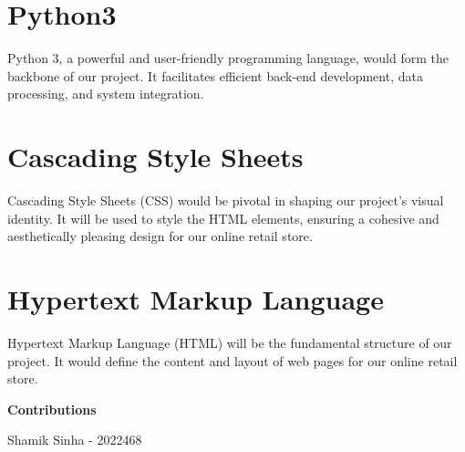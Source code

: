 \documentclass[12pt]{article}
\begin{document}
{\section{\fontsize{17}{24}\selectfont  Python3}
Python 3, a powerful and user-friendly programming language, would form the backbone of our project. It facilitates efficient back-end development, data processing, and system integration.

\section{\fontsize{17}{24}\selectfont  Cascading Style Sheets}
Cascading Style Sheets (CSS) would be pivotal in shaping our project's visual identity. It will be used to style the HTML elements, ensuring a cohesive and aesthetically pleasing design for our online retail store.

\section{\fontsize{17}{24}\selectfont  Hypertext Markup Language}
Hypertext Markup Language (HTML) will be the fundamental structure of our project. It would define the content and layout of web pages for our online retail store.

\newpage

\begin{center}
    \fontsize{30}{36}\selectfont\textbf{Contributions}
\end{center}

Shamik Sinha - 2022468

}
\end{document}

